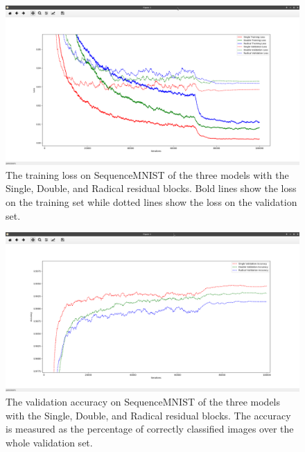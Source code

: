 \documentclass[a4paper, twoside]{article}
\begin{document}
\begin{figure}
\begin{center}
    \includegraphics[width=15cm]{seqmnistloss.png}\caption{The training loss on SequenceMNIST of the three models with the Single, Double, and Radical residual blocks. Bold lines show the loss on the training set while dotted lines show the loss on the validation set.}\label{figseqmnistloss}
\end{center}
\end{figure}
\begin{figure}
\begin{center}
    \includegraphics[width=15cm]{seqmnistacc.png}\caption{The validation accuracy on SequenceMNIST of the three models with the Single, Double, and Radical residual blocks. The accuracy is measured as the percentage of correctly classified images over the whole validation set.}\label{figseqmnistacc}
\end{center}
\end{figure}
\end{document}
